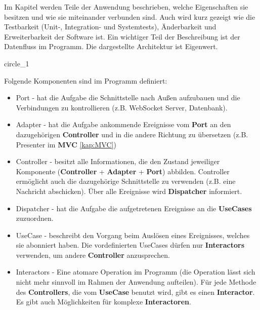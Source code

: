 Im Kapitel werden Teile der Anwendung beschrieben, welche Eigenschaften sie besitzen und wie sie miteinander verbunden sind.
Auch wird kurz gezeigt wie die Testbarkeit (Unit-, Integration- und Systemtests), 
Änderbarkeit und Erweiterbarkeit der Software ist.    
Ein wichtiger Teil der Beschreibung ist der Datenfluss im Programm.
Die dargestellte Architektur ist Eigenwert.

{circle_1}

Folgende Komponenten sind im Programm definiert:
\begin{itemize}
    \item Port - hat die Aufgabe die Schnittstelle nach Außen aufzubauen und die Verbindungen zu kontrollieren (z.B. WebSocket Server, Datenbank).
    \item Adapter  - hat die Aufgabe ankommende Ereignisse vom \textbf{Port} an den dazugehörigen \textbf{Controller} und in die andere Richtung zu übersetzen (z.B. Presenter im \textbf{MVC} \ref{kap:MVC})
    \item Controller - besitzt alle Informationen, die den Zustand jeweiliger Komponente (\textbf{Controller} + \textbf{Adapter} + \textbf{Port}) abbilden.
    Controller ermöglicht auch die dazugehörige Schnittstelle zu verwenden (z.B. eine Nachricht abschicken).
    Über alle Ereignisse wird \textbf{Dispatcher} informiert.
    \item Dispatcher - hat die Aufgabe die aufgetretenen Ereignisse an die \textbf{UseCases} zuzuordnen.
    \item UseCase - beschreibt den Vorgang beim Auslösen eines Ereignisses, welches sie abonniert haben. Die
    vordefinierten UseCases dürfen nur \textbf{Interactors} verwenden, um andere \textbf{Controller} anzusprechen.
    \item Interactors - Eine atomare Operation im Programm (die Operation lässt sich nicht mehr sinnvoll im Rahmen
    der Anwendung aufteilen). Für jede Methode des \textbf{Controllers}, 
    die vom \textbf{UseCase} benutzt wird, gibt es einen \textbf{Interactor}. Es gibt auch Möglichkeiten für komplexe \textbf{Interactoren}.
\end{itemize}
